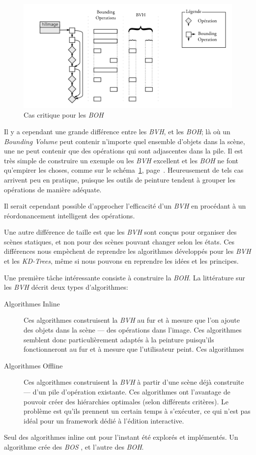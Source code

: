 		\begin{figure}[ht]
			\centering
			\includegraphics[width=\textwidth]{images/bo3} 
			\caption{Cas critique pour les \emph{BOH}}
			\label{fig:bo3}
		\end{figure}
		Il y a cependant une grande différence entre les \emph{BVH}, et les \emph{BOH}; là où un \emph{Bounding Volume}
		peut contenir n'importe quel ensemble
		d'objets dans la scène, une \BO ne peut contenir que des opérations qui sont adjascentes dans la pile. Il
		est très simple de construire un exemple ou les \emph{BVH} excellent et les \emph{BOH} ne font qu'empirer
		les choses, comme sur le schéma~\ref{fig:bo3}, page~\pageref{fig:bo3}. Heureusement de tels cas arrivent peu 
		en pratique, puisque les outils de peinture tendent à grouper les opérations de manière adéquate.

		Il serait cependant possible d'approcher l'efficacité d'un \emph{BVH} en procédant à un réordonancement intelligent
		des opérations. 
		
		Une autre différence de taille est que les \emph{BVH} sont conçus pour organiser des scènes statiques,
		et non pour des scènes pouvant changer selon les états. Ces différences nous empèchent de reprendre 
		les algorithmes développés pour les \emph{BVH} et les \emph{KD-Trees}, 
		même si nous pouvons en reprendre les idées et les principes. 

		Une première tâche intéressante consiste à construire la \emph{BOH}. La littérature sur les \emph{BVH}
		décrit deux types d'algorithmes:
		\begin{description}
			\item[Algorithmes Inline] Ces algorithmes construisent la \emph{BVH} au fur et à mesure
			que l'on ajoute des objets dans la scène --- des opérations dans l'image. Ces algorithmes 
			semblent donc particulièrement adaptés à la peinture puisqu'ils fonctionneront au fur et à mesure que l'utilisateur
			peint. Ces algorithmes 
			\item[Algorithmes Offline] Ces algorithmes construisent la \emph{BVH} à partir d'une 
			scène déjà construite --- d'un pile d'opération existante. Ces algorithmes ont l'avantage de pouvoir
			créer des hiérarchies optimales (selon différents critères). Le problème est qu'ils prennent un certain temps 
			à s'exécuter, ce qui n'est pas idéal pour un framework dédié à l'édition interactive. 
		\end{description}
		Seul des algorithmes inline ont pour l'instant été explorés et implémentés. Un algorithme crée des \emph{BOS} ,
		et l'autre des \emph{BOH}. 
		
